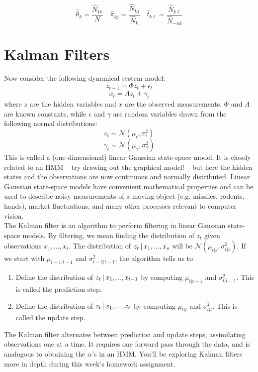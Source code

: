 \documentclass[12pt]{article}
\begin{document}
$$\hat{\theta}_k = \frac{\hat{N}_{1k}}{N} \quad \hat{\pi}_{kj} = \frac{\hat{N}_{kj}}{\hat{N}_k} \quad \hat{t}_{k\ell} = \frac{\hat{N}_{k\ell}}{\hat{N}_{-nk}} $$

\newpage 

\section{Kalman Filters}
Now consider the following dynamical system model:
\[z_{t+1} = \Phi z_t + \epsilon_t\]
\[x_t = A z_t + \gamma_t\]
where $z$ are the hidden variables and $x$ are the observed measurements. $\Phi$ and $A$ are known constants, while $\epsilon$ and $\gamma$ are random variables drawn from the following normal distributions:
\[\epsilon_t \sim \mathcal{N}(\mu_\epsilon, \sigma_\epsilon^2)\]
\[\gamma_t \sim \mathcal{N}(\mu_\gamma, \sigma_\gamma^2)\]
This is called a (one-dimensional) linear Gaussian state-space model. It is closely related to an HMM -- try drawing out the graphical model! -- but here the hidden states and the observations are now continuous and normally distributed. Linear Gaussian state-space models have convenient mathematical properties and can be used to describe
noisy measurements of a moving object (e.g. missiles, rodents, hands), market fluctuations, and many other processes relevant to computer vision.\\

The Kalman filter is an algorithm to perform filtering in linear Gaussian state-space models. By filtering, we mean finding the distribution of $z_t$ given observations $x_1, ..., x_t$. The distribution of $z_t \,|\, x_1, ..., x_s$ will be $\mathcal{N}(\mu_{t|s}, \sigma^2_{t|s})$. If we start with $\mu_{t-1|t-1}$ and $\sigma^2_{t-1|t-1}$, the algorithm tells us to
\begin{enumerate}
	\item Define the distribution of $z_{t} \,|\, x_1, ..., x_{t-1}$ by computing $\mu_{t|t-1}$ and $\sigma^2_{t|t-1}$. This is called the prediction step.
	\item Define the distribution of $z_{t} \,|\, x_1, ..., x_t$ by computing $\mu_{t|t}$ and $\sigma^2_{t|t}$. This is called the update step.
\end{enumerate}
The Kalman filter alternates between prediction and update steps, assimilating observations one at a time. It requires one forward pass through the data, and is analogous to obtaining the $\alpha$'s in an HMM. You'll be exploring Kalman filters more in depth during this week's homework assignment.
\end{document}
